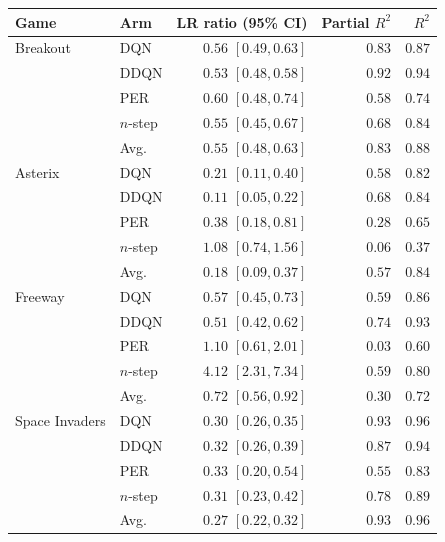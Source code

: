 \begin{tabular}{llrrr}
\toprule
Game & Arm & LR ratio (95\% CI) & Partial $R^2$ & $R^2$ \\
\midrule
Breakout & DQN & $0.56$ $[0.49, 0.63]$ & $0.83$ & $0.87$ \\
 & DDQN & $0.53$ $[0.48, 0.58]$ & $0.92$ & $0.94$ \\
 & PER & $0.60$ $[0.48, 0.74]$ & $0.58$ & $0.74$ \\
 & $n$-step & $0.55$ $[0.45, 0.67]$ & $0.68$ & $0.84$ \\
 & Avg. & $0.55$ $[0.48, 0.63]$ & $0.83$ & $0.88$ \\
\midrule
Asterix & DQN & $0.21$ $[0.11, 0.40]$ & $0.58$ & $0.82$ \\
 & DDQN & $0.11$ $[0.05, 0.22]$ & $0.68$ & $0.84$ \\
 & PER & $0.38$ $[0.18, 0.81]$ & $0.28$ & $0.65$ \\
 & $n$-step & $1.08$ $[0.74, 1.56]$ & $0.06$ & $0.37$ \\
 & Avg. & $0.18$ $[0.09, 0.37]$ & $0.57$ & $0.84$ \\
\midrule
Freeway & DQN & $0.57$ $[0.45, 0.73]$ & $0.59$ & $0.86$ \\
 & DDQN & $0.51$ $[0.42, 0.62]$ & $0.74$ & $0.93$ \\
 & PER & $1.10$ $[0.61, 2.01]$ & $0.03$ & $0.60$ \\
 & $n$-step & $4.12$ $[2.31, 7.34]$ & $0.59$ & $0.80$ \\
 & Avg. & $0.72$ $[0.56, 0.92]$ & $0.30$ & $0.72$ \\
\midrule
Space Invaders & DQN & $0.30$ $[0.26, 0.35]$ & $0.93$ & $0.96$ \\
 & DDQN & $0.32$ $[0.26, 0.39]$ & $0.87$ & $0.94$ \\
 & PER & $0.33$ $[0.20, 0.54]$ & $0.55$ & $0.83$ \\
 & $n$-step & $0.31$ $[0.23, 0.42]$ & $0.78$ & $0.89$ \\
 & Avg. & $0.27$ $[0.22, 0.32]$ & $0.93$ & $0.96$ \\
\bottomrule
\end{tabular}
